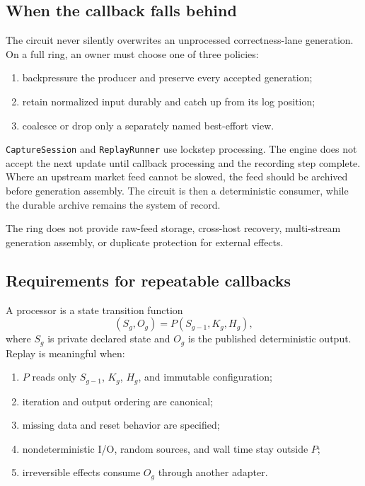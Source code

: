 \documentclass{strategynet-journal}
\begin{document}
\subsection{When the callback falls behind}

The circuit never silently overwrites an unprocessed correctness-lane
generation.  On a full ring, an owner must choose one of three policies:
\begin{enumerate}
  \item backpressure the producer and preserve every accepted generation;
  \item retain normalized input durably and catch up from its log position;
  \item coalesce or drop only a separately named best-effort view.
\end{enumerate}

\texttt{CaptureSession} and \texttt{ReplayRunner} use lockstep processing.
The engine does not accept the next update until callback processing and the
recording step complete.  Where an upstream market feed cannot be slowed, the
feed should be archived before generation assembly.  The circuit is then a
deterministic consumer, while the durable archive remains the system of record.

The ring does not provide raw-feed storage, cross-host recovery, multi-stream
generation assembly, or duplicate protection for external effects.

\subsection{Requirements for repeatable callbacks}

A processor is a state transition function
\[
  (S_g,O_g)=P(S_{g-1},K_g,H_g),
\]
where \(S_g\) is private declared state and \(O_g\) is the published
deterministic output.  Replay is meaningful when:
\begin{enumerate}
  \item \(P\) reads only \(S_{g-1}\), \(K_g\), \(H_g\), and immutable
        configuration;
  \item iteration and output ordering are canonical;
  \item missing data and reset behavior are specified;
  \item nondeterministic I/O, random sources, and wall time stay outside \(P\);
  \item irreversible effects consume \(O_g\) through another adapter.
\end{enumerate}
\end{document}
